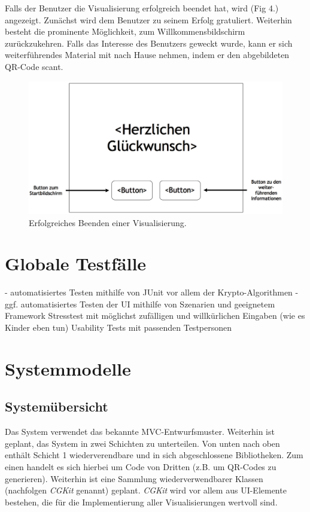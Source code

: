 \documentclass{article}
\begin{document}
Falls der Benutzer die Visualisierung erfolgreich beendet hat, wird (Fig 4.) angezeigt. Zunächst wird dem Benutzer zu seinem Erfolg gratuliert. Weiterhin besteht die prominente Möglichkeit, zum Willkommensbildschirm zurückzukehren. Falls das Interesse des Benutzers geweckt wurde, kann er sich weiterführendes Material mit nach Hause nehmen, indem er den abgebildeten QR-Code scant.

\begin{figure}[H]
  \centering
    \includegraphics[width=\textwidth]{resources/ui_walkthrough_end-draft}
  \caption{Erfolgreiches Beenden einer Visualisierung.}
\end{figure}

\section{Globale Testfälle}
- automatisiertes Testen mithilfe von JUnit vor allem der Krypto-Algorithmen
- ggf. automatisiertes Testen der UI mithilfe von Szenarien und geeignetem Framework
Stresstest mit möglichst zufälligen und willkürlichen Eingaben (wie es Kinder eben tun)
Usability Tests mit passenden Testpersonen

\section{Systemmodelle}

\subsection{Systemübersicht}
Das System verwendet das bekannte MVC-Entwurfsmuster. Weiterhin ist geplant, das System in zwei Schichten zu unterteilen. Von unten nach oben enthält Schicht 1 wiederverendbare und in sich abgeschlossene Bibliotheken. Zum einen handelt es sich hierbei um Code von Dritten (z.B. um QR-Codes zu generieren). Weiterhin ist eine Sammlung wiederverwendbarer Klassen (nachfolgen {\it CGKit} genannt) geplant. {\it CGKit} wird vor allem aus UI-Elemente bestehen, die für die Implementierung aller Visualisierungen wertvoll sind.
\end{document}
